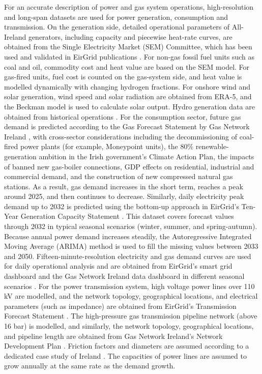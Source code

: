 \documentclass[pdflatex,lineno,sn-mathphys,Numbered]{sn-jnl}%
\begin{document}
For an accurate description of power and gas system operations, high-resolution and long-span datasets are used for power generation, consumption and transmission. On the generation side, detailed operational parameters of All-Ireland generators, including capacity and piecewise heat-rate curves, are obtained from the Single Electricity Market (SEM) Committee, which has been used and validated in EirGrid publications \cite{SEMPLEXOS}. For non-gas fossil fuel units such as coal and oil, commodity cost and heat value are based on the SEM model. For gas-fired units, fuel cost is counted on the gas-system side, and heat value is modelled dynamically with changing hydrogen fractions. For onshore wind and solar generation, wind speed and solar radiation are obtained from ERA-5, and the Beckman model is used to calculate solar output. Hydro generation data are obtained from historical operations \cite{SystemandRenewableDataReports}.
For the consumption sector, future gas demand is predicted according to the Gas Forecast Statement by Gas Network Ireland \cite{GasForecastStatement2022}, with cross-sector considerations including the decommissioning of coal-fired power plants (for example, Moneypoint units), the 80\% renewable-generation ambition in the Irish government's Climate Action Plan, the impacts of banned new gas-boiler connections, GDP effects on residential, industrial and commercial demand, and the construction of new compressed natural gas stations. As a result, gas demand increases in the short term, reaches a peak around 2025, and then continues to decrease.
Similarly, daily electricity peak demand up to 2032 is predicted using the bottom-up approach in EirGrid's Ten-Year Generation Capacity Statement \cite{GenerationCapacity}. This dataset covers forecast values through 2032 in typical seasonal scenarios (winter, summer, and spring-autumn). Because annual power demand increases steadily, the Autoregressive Integrated Moving Average (ARIMA) method is used to fill the missing values between 2033 and 2050. Fifteen-minute-resolution electricity and gas demand curves are used for daily operational analysis and are obtained from EirGrid's smart grid dashboard and the Gas Network Ireland data dashboard in different seasonal scenarios \cite{SmartGridDashboard, GasconsumptionbyMarketSector}.
For the power transmission system, high voltage power lines over 110 kV are modelled, and the network topology, geographical locations, and electrical parameters (such as impedance) are obtained from EirGrid's Transmission Forecast Statement \cite{AllIslandTenYear}. The high-pressure gas transmission pipeline network (above 16 bar) is modelled, and similarly, the network topology, geographical locations, and pipeline length are obtained from Gas Network Ireland's Network Development Plan \cite{NetworkDevelopmentPlan}. Friction factors and diameters are assumed according to a dedicated case study of Ireland \cite{ekhtiari2022green}. The capacities of power lines are assumed to grow annually at the same rate as the demand growth.
\end{document}
